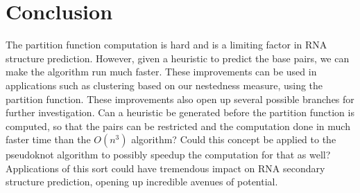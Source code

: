 
\section{Conclusion}

The partition function computation is hard and is a limiting factor in
RNA structure prediction. However, given a heuristic to predict the
base pairs, we can make the algorithm run much faster. These
improvements can be used in applications such as clustering based on
our nestedness measure, using the partition function. These
improvements also open up several possible branches for further
investigation. Can a heuristic be generated before the partition
function is computed, so that the pairs can be restricted and the
computation done in much faster time than the $O(n^3)$ algorithm?
Could this concept be applied to the pseudoknot algorithm to possibly
speedup the computation for that as well? Applications of this sort
could have tremendous impact on RNA secondary structure prediction,
opening up incredible avenues of potential.

